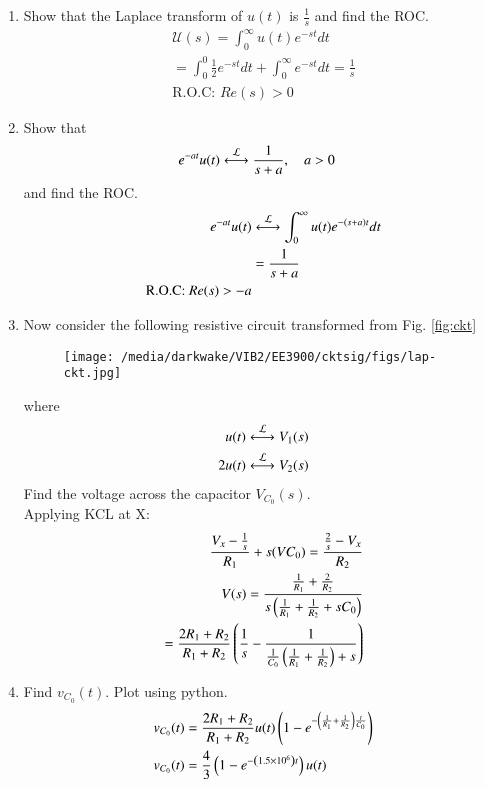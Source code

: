 \documentclass[journal,12pt,twocolumn]{IEEEtran}
\renewcommand\thesection{\arabic{section}}
\begin{document}
\begin{enumerate}[label=\arabic*.,ref=\thesection.\theenumi]
\item Show that the Laplace transform of $u(t)$ is $\frac{1}{s}$ and find the ROC.\\
\solution
\begin{align}
	\mathcal{U}(s) = \int_{0}^{\infty}u(t)e^{-st}dt \\
	= \int_{0}^{0}\frac{1}{2}e^{-st}dt + \int_{0}^{\infty}e^{-st}dt 
	= \frac{1}{s}\\
	\text{R.O.C: } Re(s) > 0
	\label{eq:L-u}
\end{align}
\item Show that 
	\begin{align}
		e^{-at}u(t) &\overset{\mathcal{L}}{\longleftrightarrow} \frac{1}{s+a}, \quad a > 0
	\end{align}
and find the ROC.
\solution
\begin{align}
	e^{-at}u(t) &\overset{\mathcal{L}}{\longleftrightarrow} \int_{0}^{\infty}u(t)e^{-(s + a)t}dt \\
	&= \frac{1}{s + a}\\
		\text{R.O.C: } Re(s) > -a
	\label{eq:L-u-shift}
\end{align}
\item Now consider the following resistive circuit transformed from 
Fig. \ref{fig:ckt}
\begin{figure}[!ht]
	\centering
	\texttt{[image: /media/darkwake/VIB2/EE3900/cktsig/figs/lap-ckt.jpg]}
	\caption{}
	\label{fig:lap-ckt}
\end{figure}
where 
\begin{align}
	u(t) \overset{\mathcal{L}}{\longleftrightarrow} V_1(s)
	\\
	2u(t) \overset{\mathcal{L}}{\longleftrightarrow} V_2(s)
\end{align}
Find the voltage across the capacitor $V_{C_0}(s)$.\\
\solution
Applying KCL at X:
\begin{align}
	\dfrac{V_x - \frac{1}{s}}{R_1} + s(V C_0)= \dfrac{\frac{2}{s} - V_x}{R_2}\\
	V(s) = \frac{\frac{1}{R_1} + \frac{2}{R_2}}{s\left(\frac{1}{R_1} + \frac{1}{R_2} + sC_0\right)} \\
	= \frac{2R_1 + R_2}{R_1 + R_2}\left(\frac{1}{s} - \frac{1}{\frac{1}{C_0}\left(\frac{1}{R_1} + \frac{1}{R_2}\right) + s}\right) 
	\label{eq:V-s}
\end{align}
\item Find $v_{C_0}(t)$.  Plot using python.
\begin{align}
	& v_{C_0}(t) = \frac{2R_1 + R_2}{R_1 + R_2}u(t)\brak{1 - e^{-\brak{\frac{1}{R_1} + \frac{1}{R_2}}\frac{t}{C_0}}} \\
	&v_{C_0}(t) = \frac{4}{3}\brak{1 - e^{-\brak{1.5 \times 10^6}t}}u(t)

\end{align}
\end{enumerate}
\end{document}
